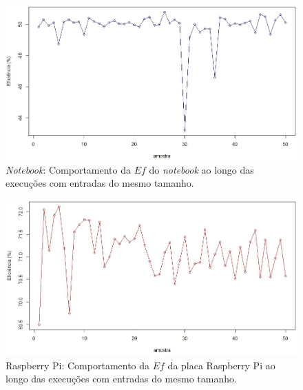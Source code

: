 \begin{figure}[htb]  
	\centering
	\includegraphics[width=\textwidth]{figuras/res_011_50efnt}
	\caption[\textit{Notebook}: eficiência]{\textit{Notebook}: Comportamento da $Ef$ do \textit{notebook} ao longo das execuções com entradas do mesmo tamanho.}
	\label{figura:res_011}
\end{figure}  

\begin{figure}[htb]  
	\centering
	\includegraphics[width=\textwidth]{figuras/res_012_50efrp}
	\caption[Raspberry Pi: eficiência]{Raspberry Pi: Comportamento da $Ef$ da placa Raspberry Pi ao longo das execuções com entradas do mesmo tamanho.}
	\label{figura:res_012}
\end{figure}